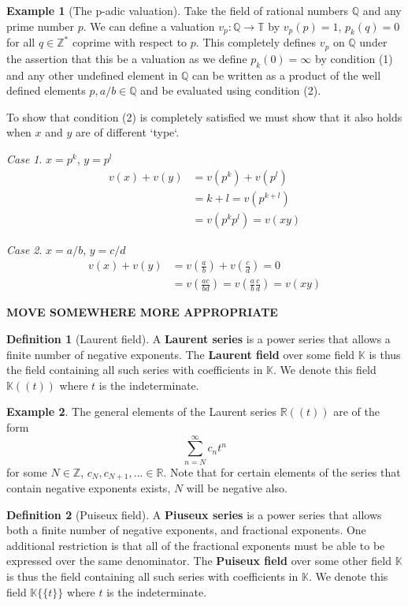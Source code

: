 \documentclass[12pt,a4paper]{amsart}
\newcommand{\Z}{\mathbb{Z}}
\newcommand{\Q}{\mathbb{Q}}
\newcommand{\R}{\mathbb{R}}
\newcommand{\T}{\mathbb{T}}
\newcommand{\K}{\mathbb{K}}
\theoremstyle{definition}
\newtheorem{defn}{Definition}[section]
\newtheorem{ex}{Example}[section]
\theoremstyle{remark}
\newtheorem{case}{Case}
\begin{document}
\begin{ex}[The p-adic valuation]
Take the field of rational numbers $\Q$ and any prime number $p$. We can define a valuation $v_p:\Q\to\T$ by $v_p(p)=1$, $p_k(q) = 0$ for all $q\in\Z^*$ coprime with respect to $p$. This completely defines $v_p$ on $\Q$ under the assertion that this be a valuation as we define $p_k(0) = \infty$ by condition (1) and any other undefined element in $\Q$ can be written as a product of the well defined elements $p, a/b\in\Q$ and be evaluated using condition (2).

To show that condition (2) is completely satisfied we must show that it also holds when $x$ and $y$ are of different `type`.
\begin{case}
$x = p^k$, $y = p^l$
\begin{align*}
    v(x) + v(y) &= v(p^k) + v(p^l)\\
    &= k+l = v(p^{k+l})\\
    &= v(p^k p^l) = v(xy)
\end{align*}
\end{case}
\begin{case}
$x = a/b$, $y = c/d$
\begin{align*}
    v(x) + v(y) &= v\left(\frac{a}{b}\right) + v\left(\frac{c}{d}\right) = 0\\
    &= v\left(\frac{ac}{bd}\right) = v\left(\frac{a}{b}\frac{c}{d}\right) = 
    v(xy)
\end{align*}
\end{case}
\end{ex}

\textbf{MOVE SOMEWHERE MORE APPROPRIATE}{
\begin{defn}[Laurent field]
A \textbf{Laurent series} is a power series that allows a finite number of negative exponents.
The \textbf{Laurent field} over some field $\K$ is thus the field containing all such series with coefficients in $\K$. We denote this field $\K((t))$ where $t$ is the indeterminate.
\end{defn}

\begin{ex}
The general elements of the Laurent series $\R((t))$ are of the form
\begin{equation*}
    \sum_{n=N}^\infty c_n t^n
\end{equation*}
for some $N\in\Z$, $c_N,c_{N+1},\dots\in\R$. Note that for certain elements of the series that contain negative exponents exists, $N$ will be negative also.
\end{ex}

\begin{defn}[Puiseux field]
A \textbf{Piuseux series} is a power series that allows both a finite number of negative exponents, and fractional exponents. One additional restriction is that all of the fractional exponents must be able to be expressed over the same denominator.
The \textbf{Puiseux field} over some other field $\K$ is thus the field containing all such series with coefficients in $\K$. We denote this field $\K\{\{t\}\}$ where $t$ is the indeterminate.
\end{defn}
}
\end{document}
